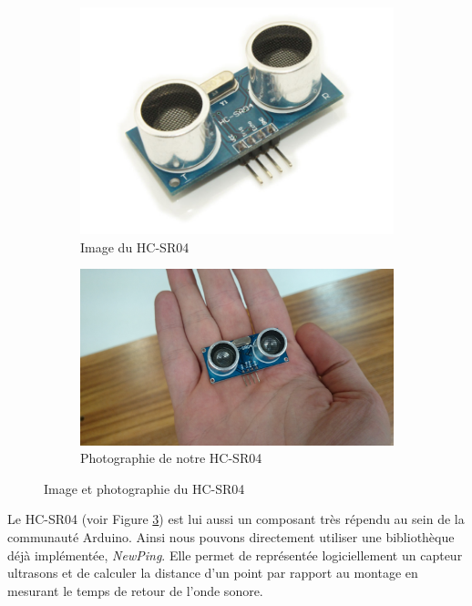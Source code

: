 \documentclass[a4paper,10pt]{report}
\begin{document}
	\begin{figure}
	  \begin{subfigure}{.5\textwidth}
	    \centering
	    \includegraphics[scale=0.2]{img/image_hcsr04.jpg}
	    \caption{Image du HC-SR04}
	    \label{imagehcsr04}
	  \end{subfigure}%
	  \begin{subfigure}{.5\textwidth}
	    \centering
	    \includegraphics[scale=0.06]{img/hcsr04.JPG}
	    \caption{Photographie de notre HC-SR04}
	    \label{photohcsr04}
	  \end{subfigure}
	  \caption{Image et photographie du HC-SR04}
	  \label{hcsr04}
	\end{figure}
	
	Le HC-SR04 (voir Figure \ref{hcsr04}) est lui aussi un composant très 
répendu au sein de la communauté Arduino. Ainsi nous pouvons directement 
utiliser une bibliothèque déjà implémentée, \textit{NewPing}\cite{newping}. 
Elle permet de représentée logiciellement un capteur ultrasons et de calculer 
la distance d'un point par rapport au montage en mesurant le temps de retour de 
l'onde sonore.
	
\end{document}
